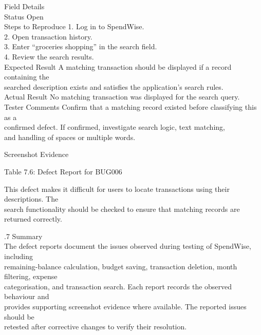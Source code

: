 \documentclass[12pt,a4paper]{report}
\begin{document}
\smallskip
Field                 Details\\ 
Status                Open\\ 
Steps to Reproduce    1. Log in to SpendWise.\\ 
2. Open transaction history.\\ 
3. Enter “groceries shopping” in the search field.\\ 
4. Review the search results.\\ 
Expected Result       A matching transaction should be displayed if a record containing the\\ 
searched description exists and satisfies the application’s search rules.\\ 
Actual Result         No matching transaction was displayed for the search query.\\ 
Tester Comments       Confirm that a matching record existed before classifying this as a\\ 
confirmed defect. If confirmed, investigate search logic, text matching,\\ 
and handling of spaces or multiple words.\\ 

\smallskip

\smallskip

\smallskip

\smallskip
Screenshot Evidence\\ 

\smallskip

\smallskip

\smallskip

\smallskip
Table 7.6: Defect Report for BUG006\\ 

\smallskip

\smallskip
This defect makes it difficult for users to locate transactions using their descriptions. The\\ 
search functionality should be checked to ensure that matching records are returned correctly.\\ 

\smallskip

.7 Summary\\ 

\smallskip
The defect reports document the issues observed during testing of SpendWise, including\\ 
remaining-balance calculation, budget saving, transaction deletion, month filtering, expense\\ 
categorisation, and transaction search. Each report records the observed behaviour and\\ 
provides supporting screenshot evidence where available. The reported issues should be\\ 
retested after corrective changes to verify their resolution.\\ 
\end{document}
